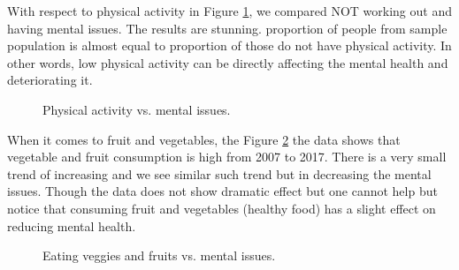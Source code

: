 \documentclass[letterpaper, 10 pt, conference]{ieeeconf}  %
\begin{document}
With respect to physical activity in Figure \ref{fig:physical}, we compared NOT working out and having mental issues.
The results are stunning. proportion of people from sample population is almost equal to proportion of those do not 
have physical activity. In other words, low physical activity can be directly affecting the mental health and deteriorating it. 

\begin{figure}[!htb]
        \caption{\label{fig:physical} Physical activity vs. mental issues.}
\end{figure}

When it comes to fruit and vegetables, the Figure \ref{fig:veg-fruit} the data shows that vegetable and fruit consumption is high from 2007 to 2017.
There is a very small trend of increasing and we see similar such trend but in decreasing the mental issues. 
Though the data does not show dramatic effect but one cannot help but notice that consuming fruit and vegetables (healthy food)
has a slight effect on reducing mental health.

\begin{figure}[!htb]
        \caption{\label{fig:veg-fruit} Eating veggies and fruits vs. mental issues.}
\end{figure}
\end{document}
